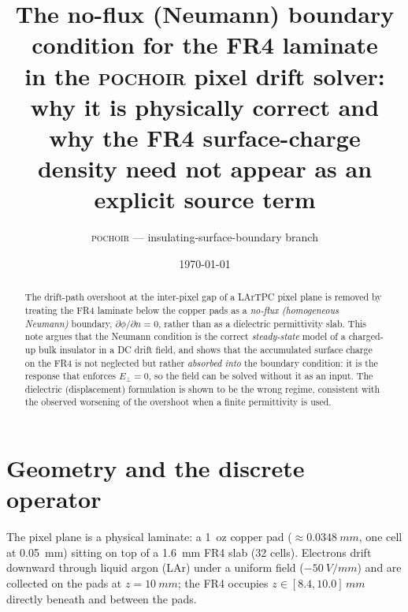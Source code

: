 \documentclass[11pt]{article}
\title{The no-flux (Neumann) boundary condition for the FR4 laminate\\
       in the \textsc{pochoir} pixel drift solver:\\
       why it is physically correct and why the FR4 surface-charge\\
       density need not appear as an explicit source term}
\author{\textsc{pochoir} --- insulating-surface-boundary branch}
\date{\today}
\newcommand{\En}{E_{\perp}}
\begin{document}
\maketitle

\begin{abstract}
The drift-path overshoot at the inter-pixel gap of a LArTPC pixel plane is removed
by treating the FR4 laminate below the copper pads as a \emph{no-flux (homogeneous
Neumann)} boundary, $\partial\phi/\partial n = 0$, rather than as a dielectric
permittivity slab. This note argues that the Neumann condition is the correct
\emph{steady-state} model of a charged-up bulk insulator in a DC drift field, and
shows that the accumulated surface charge on the FR4 is not neglected but rather
\emph{absorbed into} the boundary condition: it is the response that enforces
$\En=0$, so the field can be solved without it as an input. The dielectric
(displacement) formulation is shown to be the wrong regime, consistent with the
observed worsening of the overshoot when a finite permittivity is used.
\end{abstract}

\section{Geometry and the discrete operator}

The pixel plane is a physical laminate: a \SI{1}{oz} copper pad
($\approx\SI{0.0348}{mm}$, one cell at \SI{0.05}{mm}) sitting on top of a
\SI{1.6}{mm} FR4 slab (32 cells). Electrons drift downward through liquid argon
(LAr) under a uniform field ($-\SI{50}{V/mm}$) and are collected on the pads at
$z=\SI{10}{mm}$; the FR4 occupies $z\in[8.4,10.0]\,\si{mm}$ directly beneath and
between the pads.
\end{document}
